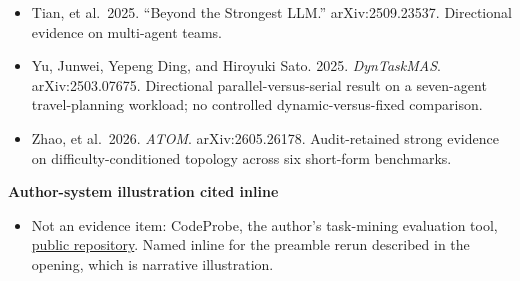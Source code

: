 \begin{itemize}
\item
  Tian, et al.~2025. ``Beyond the Strongest LLM.'' arXiv:2509.23537. Directional evidence on multi-agent teams.
\item
  Yu, Junwei, Yepeng Ding, and Hiroyuki Sato. 2025. \emph{DynTaskMAS}. arXiv:2503.07675. Directional parallel-versus-serial result on a seven-agent travel-planning workload; no controlled dynamic-versus-fixed comparison.
\item
  Zhao, et al.~2026. \emph{ATOM}. arXiv:2605.26178. Audit-retained strong evidence on difficulty-conditioned topology across six short-form benchmarks.
\end{itemize}

\textbf{Author-system illustration cited inline}

\begin{itemize}
\tightlist
\item
  Not an evidence item: CodeProbe, the author's task-mining evaluation tool, \href{https://github.com/sjarmak/codeprobe}{public repository}. Named inline for the preamble rerun described in the opening, which is narrative illustration.
\end{itemize}
